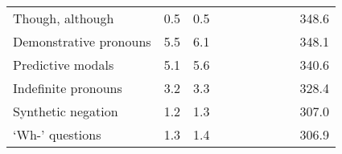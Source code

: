 \begin{table}[!t]
\begin{tabular*}{\linewidth}{@{\extracolsep{\fill}}lrrrrrrrrr}
Though, although & 0.5 & 0.5 & {\cellcolor[HTML]{F4A582}{\textcolor[HTML]{000000}{65\%}}} & {\cellcolor[HTML]{D1E5F0}{\textcolor[HTML]{000000}{129\%}}} & {\cellcolor[HTML]{B2182B}{\textcolor[HTML]{FFFFFF}{21\%}}} & {\cellcolor[HTML]{D6604D}{\textcolor[HTML]{FFFFFF}{28\%}}} & {\cellcolor[HTML]{FDDBC7}{\textcolor[HTML]{000000}{83\%}}} & {\cellcolor[HTML]{FDDBC7}{\textcolor[HTML]{000000}{90\%}}} & 348.6 \\ 
Demonstrative pronouns & 5.5 & 6.1 & {\cellcolor[HTML]{F4A582}{\textcolor[HTML]{000000}{55\%}}} & {\cellcolor[HTML]{D6604D}{\textcolor[HTML]{FFFFFF}{50\%}}} & {\cellcolor[HTML]{F4A582}{\textcolor[HTML]{000000}{71\%}}} & {\cellcolor[HTML]{FDDBC7}{\textcolor[HTML]{000000}{76\%}}} & {\cellcolor[HTML]{F7F7F7}{\textcolor[HTML]{000000}{99\%}}} & {\cellcolor[HTML]{F7F7F7}{\textcolor[HTML]{000000}{97\%}}} & 348.1 \\ 
Predictive modals & 5.1 & 5.6 & {\cellcolor[HTML]{F4A582}{\textcolor[HTML]{000000}{72\%}}} & {\cellcolor[HTML]{F4A582}{\textcolor[HTML]{000000}{57\%}}} & {\cellcolor[HTML]{F7F7F7}{\textcolor[HTML]{000000}{95\%}}} & {\cellcolor[HTML]{F7F7F7}{\textcolor[HTML]{000000}{106\%}}} & {\cellcolor[HTML]{D1E5F0}{\textcolor[HTML]{000000}{118\%}}} & {\cellcolor[HTML]{D1E5F0}{\textcolor[HTML]{000000}{111\%}}} & 340.6 \\ 
Indefinite pronouns & 3.2 & 3.3 & {\cellcolor[HTML]{F4A582}{\textcolor[HTML]{000000}{73\%}}} & {\cellcolor[HTML]{FDDBC7}{\textcolor[HTML]{000000}{77\%}}} & {\cellcolor[HTML]{FDDBC7}{\textcolor[HTML]{000000}{84\%}}} & {\cellcolor[HTML]{FDDBC7}{\textcolor[HTML]{000000}{83\%}}} & {\cellcolor[HTML]{92C5DE}{\textcolor[HTML]{000000}{156\%}}} & {\cellcolor[HTML]{92C5DE}{\textcolor[HTML]{000000}{149\%}}} & 328.4 \\ 
Synthetic negation & 1.2 & 1.3 & {\cellcolor[HTML]{D6604D}{\textcolor[HTML]{FFFFFF}{36\%}}} & {\cellcolor[HTML]{F4A582}{\textcolor[HTML]{000000}{51\%}}} & {\cellcolor[HTML]{D6604D}{\textcolor[HTML]{FFFFFF}{36\%}}} & {\cellcolor[HTML]{D6604D}{\textcolor[HTML]{FFFFFF}{36\%}}} & {\cellcolor[HTML]{F7F7F7}{\textcolor[HTML]{000000}{93\%}}} & {\cellcolor[HTML]{F7F7F7}{\textcolor[HTML]{000000}{91\%}}} & 307.0 \\ 
‘Wh-’ questions & 1.3 & 1.4 & {\cellcolor[HTML]{FDDBC7}{\textcolor[HTML]{000000}{89\%}}} & {\cellcolor[HTML]{F4A582}{\textcolor[HTML]{000000}{56\%}}} & {\cellcolor[HTML]{92C5DE}{\textcolor[HTML]{000000}{141\%}}} & {\cellcolor[HTML]{92C5DE}{\textcolor[HTML]{000000}{137\%}}} & {\cellcolor[HTML]{92C5DE}{\textcolor[HTML]{000000}{140\%}}} & {\cellcolor[HTML]{D1E5F0}{\textcolor[HTML]{000000}{132\%}}} & 306.9 \\ 

\end{tabular*}
\end{table}
